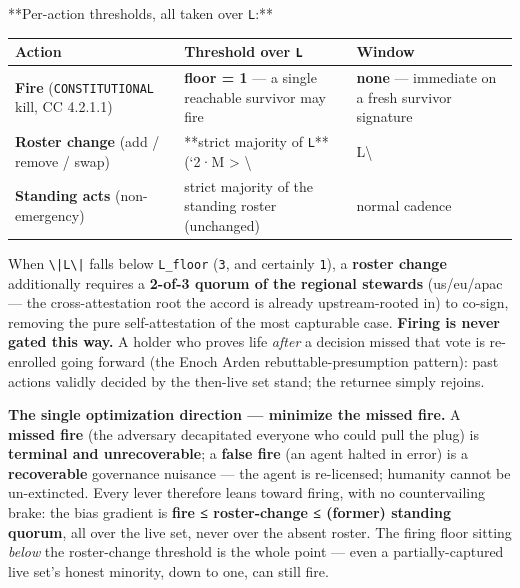 \documentclass[11pt]{article}
\begin{document}
**Per-action thresholds, all taken over \texttt{L}:**


{\footnotesize
\begin{longtable}{|p{5.33cm}|p{5.33cm}|p{5.33cm}|}\hline
\textbf{Action} & \textbf{Threshold over \texttt{L}} & \textbf{Window} \\ \hline\endhead
\textbf{Fire} (\texttt{CONSTITUTIONAL} kill, CC 4.2.1.1) & \textbf{floor = 1} — a single reachable survivor may fire & \textbf{none} — immediate on a fresh survivor signature \\ \hline
\textbf{Roster change} (add / remove / swap) & **strict majority of \texttt{L}** (`2·M > \textbackslash{} & L\textbackslash{} \\ \hline
\textbf{Standing acts} (non-emergency) & strict majority of the standing roster (unchanged) & normal cadence \\ \hline
\end{longtable}}


When \texttt{\textbackslash{}|L\textbackslash{}|} falls below \texttt{L\_floor} (\texttt{3}, and certainly \texttt{1}), a \textbf{roster change} additionally requires a \textbf{2-of-3 quorum of the regional stewards} (us/eu/apac — the cross-attestation root the accord is already upstream-rooted in) to co-sign, removing the pure self-attestation of the most capturable case. \textbf{Firing is never gated this way.} A holder who proves life \textit{after} a decision missed that vote is re-enrolled going forward (the Enoch Arden rebuttable-presumption pattern): past actions validly decided by the then-live set stand; the returnee simply rejoins.


\textbf{The single optimization direction — minimize the missed fire.} A \textbf{missed fire} (the adversary decapitated everyone who could pull the plug) is \textbf{terminal and unrecoverable}; a \textbf{false fire} (an agent halted in error) is a \textbf{recoverable} governance nuisance — the agent is re-licensed; humanity cannot be un-extincted. Every lever therefore leans toward firing, with no countervailing brake: the bias gradient is \textbf{fire ≤ roster-change ≤ (former) standing quorum}, all over the live set, never over the absent roster. The firing floor sitting \textit{below} the roster-change threshold is the whole point — even a partially-captured live set's honest minority, down to one, can still fire.
\end{document}
